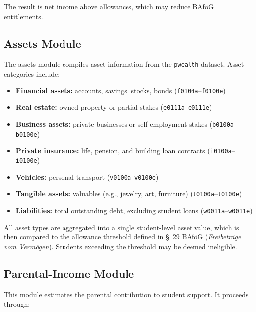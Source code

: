 The result is net income above allowances, which may reduce BAföG entitlements.

\subsection{Assets Module}

The assets module compiles asset information from the \texttt{pwealth} dataset. Asset categories include:

\begin{itemize}
  \item \textbf{Financial assets:} accounts, savings, stocks, bonds (\texttt{f0100a}–\texttt{f0100e})
  \item \textbf{Real estate:} owned property or partial stakes (\texttt{e0111a}–\texttt{e0111e})
  \item \textbf{Business assets:} private businesses or self-employment stakes (\texttt{b0100a}–\texttt{b0100e})
  \item \textbf{Private insurance:} life, pension, and building loan contracts (\texttt{i0100a}–\texttt{i0100e})
  \item \textbf{Vehicles:} personal transport (\texttt{v0100a}–\texttt{v0100e})
  \item \textbf{Tangible assets:} valuables (e.g., jewelry, art, furniture) (\texttt{t0100a}–\texttt{t0100e})
  \item \textbf{Liabilities:} total outstanding debt, excluding student loans (\texttt{w0011a}–\texttt{w0011e})
\end{itemize}

All asset types are aggregated into a single student-level asset value, which is then compared to the allowance threshold defined in §~29 BAföG (\emph{Freibeträge vom Vermögen}). Students exceeding the threshold may be deemed ineligible.

\subsection{Parental-Income Module}

This module estimates the parental contribution to student support. It proceeds through:

